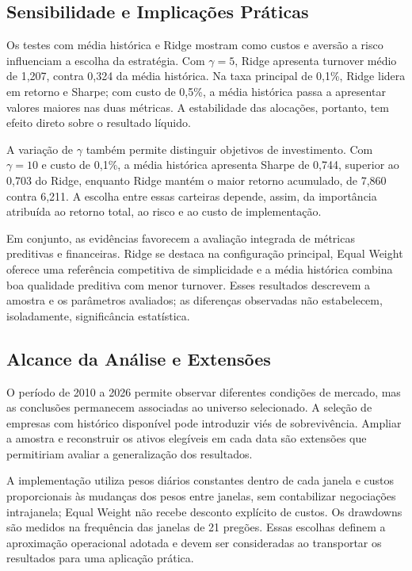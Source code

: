 \documentclass[12pt,a4paper]{article}
\begin{document}
\subsection{Sensibilidade e Implicações Práticas}

Os testes com média histórica e Ridge mostram como custos e aversão a risco influenciam a escolha da estratégia. Com $\gamma=5$, Ridge apresenta turnover médio de 1,207, contra 0,324 da média histórica. Na taxa principal de 0,1\%, Ridge lidera em retorno e Sharpe; com custo de 0,5\%, a média histórica passa a apresentar valores maiores nas duas métricas. A estabilidade das alocações, portanto, tem efeito direto sobre o resultado líquido.

A variação de $\gamma$ também permite distinguir objetivos de investimento. Com $\gamma=10$ e custo de 0,1\%, a média histórica apresenta Sharpe de 0,744, superior ao 0,703 do Ridge, enquanto Ridge mantém o maior retorno acumulado, de 7,860 contra 6,211. A escolha entre essas carteiras depende, assim, da importância atribuída ao retorno total, ao risco e ao custo de implementação.

Em conjunto, as evidências favorecem a avaliação integrada de métricas preditivas e financeiras. Ridge se destaca na configuração principal, Equal Weight oferece uma referência competitiva de simplicidade e a média histórica combina boa qualidade preditiva com menor turnover. Esses resultados descrevem a amostra e os parâmetros avaliados; as diferenças observadas não estabelecem, isoladamente, significância estatística.

\subsection{Alcance da Análise e Extensões}

O período de 2010 a 2026 permite observar diferentes condições de mercado, mas as conclusões permanecem associadas ao universo selecionado. A seleção de empresas com histórico disponível pode introduzir viés de sobrevivência. Ampliar a amostra e reconstruir os ativos elegíveis em cada data são extensões que permitiriam avaliar a generalização dos resultados.

A implementação utiliza pesos diários constantes dentro de cada janela e custos proporcionais às mudanças dos pesos entre janelas, sem contabilizar negociações intrajanela; Equal Weight não recebe desconto explícito de custos. Os drawdowns são medidos na frequência das janelas de 21 pregões. Essas escolhas definem a aproximação operacional adotada e devem ser consideradas ao transportar os resultados para uma aplicação prática.
\end{document}
